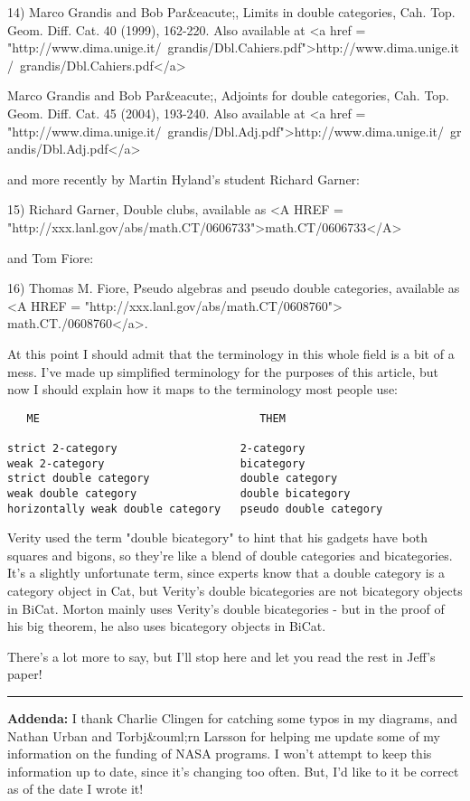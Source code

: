 14) Marco Grandis and Bob Par&eacute;, Limits in double categories, Cah.
Top. Geom. Diff. Cat. 40 (1999), 162-220.  Also available at
<a href = "http://www.dima.unige.it/~grandis/Dbl.Cahiers.pdf">http://www.dima.unige.it/~grandis/Dbl.Cahiers.pdf</a>

Marco Grandis and Bob Par&eacute;, Adjoints for double categories, Cah. 
Top. Geom. Diff. Cat. 45 (2004), 193-240.  Also available at
<a href = "http://www.dima.unige.it/~grandis/Dbl.Adj.pdf">http://www.dima.unige.it/~grandis/Dbl.Adj.pdf</a>

and more recently by Martin Hyland's student Richard Garner:

15) Richard Garner, Double clubs, available as <A HREF =
"http://xxx.lanl.gov/abs/math.CT/0606733">math.CT/0606733</A>

and Tom Fiore:

16) Thomas M. Fiore, Pseudo algebras and pseudo double categories,
available as <A HREF = "http://xxx.lanl.gov/abs/math.CT/0608760">
math.CT./0608760</a>.

At this point I should admit that the terminology in this whole
field is a bit of a mess.  I've made up simplified terminology 
for the purposes of this article, but now I should explain how it
maps to the terminology most people use:

\begin{verbatim}
   ME                                  THEM

strict 2-category                   2-category
weak 2-category                     bicategory
strict double category              double category
weak double category                double bicategory
horizontally weak double category   pseudo double category
\end{verbatim}
    

Verity used the term "double bicategory" to hint that his gadgets
have both squares and bigons, so they're like a blend of double 
categories and bicategories.  It's a slightly unfortunate term, since
experts know that a double category is a category object in Cat, but
Verity's double bicategories are not bicategory objects in BiCat.  
Morton mainly uses Verity's double bicategories - but in the proof of
his big theorem, he also uses bicategory objects in BiCat.  

There's a lot more to say, but I'll stop here and let you read
the rest in Jeff's paper!

\par\noindent\rule{\textwidth}{0.4pt}
\textbf{Addenda:} I thank Charlie Clingen for catching some typos
in my diagrams, and Nathan Urban and Torbj&ouml;rn Larsson for helping me
update some of my information on the funding of NASA programs.  I
won't attempt to keep this information up to date, since it's changing
too often.  But, I'd like to it be correct as of the date I wrote it!

